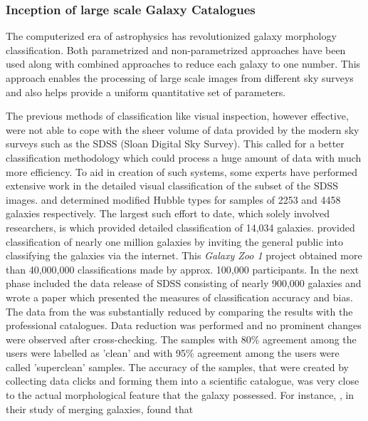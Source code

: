 \documentclass[fleqn,usenatbib]{mnras}
\begin{document}
\subsubsection{\textbf{Inception of large scale Galaxy Catalogues}}

\hspace{0.25 in}The computerized era of astrophysics has revolutionized galaxy morphology classification. Both parametrized \citet{1968adga.book.....S, Cohen_2003} and non-parametrized approaches have been used along with combined approaches \citet{2003ApJS..147....1C,2004AJ....128..163L} to reduce each galaxy to one number. This approach enables the processing of large scale images from different sky surveys \citep{Djorgovski_2013} and also helps provide a uniform quantitative set of parameters. 

The previous methods of classification like visual inspection, however effective, were not able to cope with the sheer volume of data provided by the modern sky surveys such as the SDSS (Sloan Digital Sky Survey). This called for a better classification methodology which could process a huge amount of data with much more efficiency. To aid in creation of such systems, some experts have performed extensive work in the detailed visual classification of the subset of the SDSS images. \citet{2007AJ....134..579F} and \citet{refId0} determined modified Hubble types for samples of 2253 and 4458 galaxies respectively. The largest such effort to date, which solely involved researchers, is \citet{2010ApJS..186..427N} which provided detailed classification of 14,034 galaxies. \citet{2008MNRAS.389.1179L} provided classification of nearly one million galaxies by inviting the general public into classifying the galaxies via the internet. This \textit{Galaxy Zoo 1} project obtained more than 40,000,000 classifications made by approx. 100,000 participants. In the next phase \citet{Lintott_2010} included the data release of SDSS consisting of nearly 900,000 galaxies and wrote a paper which presented the measures of classification accuracy and bias. The data from the \citet{2008MNRAS.389.1179L} was substantially reduced by comparing the results with the professional catalogues. Data reduction was performed and no prominent changes were observed after cross-checking. The samples with 80\% agreement among the users were labelled as 'clean' and with 95\% agreement among the users were called 'superclean' samples. The accuracy of the samples, that were created by collecting data clicks and forming them into a scientific catalogue, was very close to the actual morphological feature that the galaxy possessed. For instance, \citet{2010MNRAS.401.1552D}, in their study of merging galaxies, found that
\end{document}
